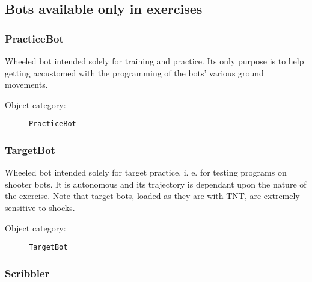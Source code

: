 
\subsection{Bots available only in exercises}

\subsubsection{PracticeBot}

Wheeled bot intended solely for training and practice. Its only purpose is to help getting accustomed with the programming of the bots' various ground movements.

\begin{description}
    \item[Object category:] \texttt{PracticeBot}
\end{description}


\subsubsection{TargetBot}

Wheeled bot intended solely for target practice, i. e. for testing programs on shooter bots. It is autonomous and its trajectory is dependant upon the nature of the exercise.
Note that target bots, loaded as they are with TNT, are extremely sensitive to shocks.
\begin{description}
    \item[Object category:] \texttt{TargetBot}
\end{description}


\subsubsection{Scribbler}


